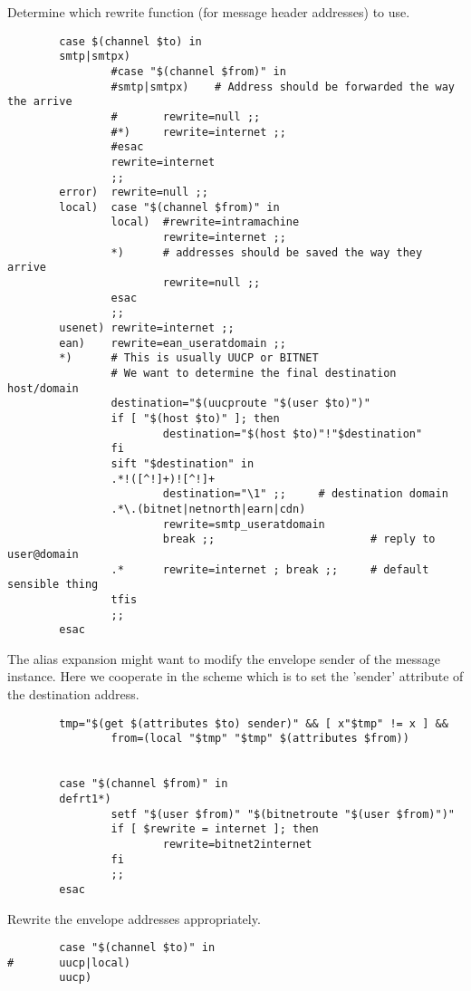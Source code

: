Determine which rewrite function (for message header addresses) to use.
\begin{verbatim}
        case $(channel $to) in
        smtp|smtpx)
                #case "$(channel $from)" in
                #smtp|smtpx)    # Address should be forwarded the way the arrive
                #       rewrite=null ;;
                #*)     rewrite=internet ;;
                #esac
                rewrite=internet
                ;;
        error)  rewrite=null ;;
        local)  case "$(channel $from)" in
                local)  #rewrite=intramachine
                        rewrite=internet ;;
                *)      # addresses should be saved the way they arrive
                        rewrite=null ;;
                esac
                ;;
        usenet) rewrite=internet ;;
        ean)    rewrite=ean_useratdomain ;;
        *)      # This is usually UUCP or BITNET
                # We want to determine the final destination host/domain
                destination="$(uucproute "$(user $to)")"
                if [ "$(host $to)" ]; then
                        destination="$(host $to)"!"$destination"
                fi
                sift "$destination" in
                .*!([^!]+)![^!]+
                        destination="\1" ;;     # destination domain
                .*\.(bitnet|netnorth|earn|cdn)
                        rewrite=smtp_useratdomain
                        break ;;                        # reply to user@domain
                .*      rewrite=internet ; break ;;     # default sensible thing
                tfis
                ;;
        esac
\end{verbatim}

The alias expansion might want to modify the envelope sender
of the message instance.  Here we cooperate in the scheme which
is to set the 'sender' attribute of the destination address.
\begin{verbatim}
        tmp="$(get $(attributes $to) sender)" && [ x"$tmp" != x ] &&
                from=(local "$tmp" "$tmp" $(attributes $from))


        case "$(channel $from)" in
        defrt1*)
                setf "$(user $from)" "$(bitnetroute "$(user $from)")"
                if [ $rewrite = internet ]; then
                        rewrite=bitnet2internet
                fi
                ;;
        esac
\end{verbatim}

Rewrite the envelope addresses appropriately.
\begin{verbatim}
        case "$(channel $to)" in
#       uucp|local)
        uucp)
\end{verbatim}


